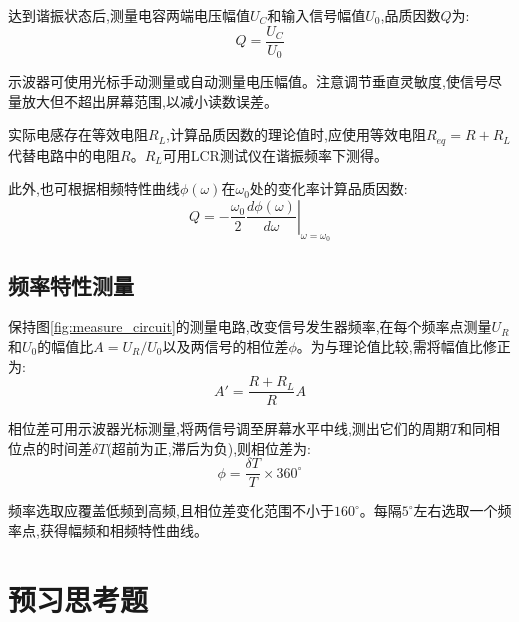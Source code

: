 \documentclass[UTF8]{ctexart}
\begin{document}
达到谐振状态后,测量电容两端电压幅值$U_C$和输入信号幅值$U_0$,品质因数$Q$为:
\begin{equation}
Q = \frac{U_C}{U_0}
\end{equation}

示波器可使用光标手动测量或自动测量电压幅值。注意调节垂直灵敏度,使信号尽量放大但不超出屏幕范围,以减小读数误差。

实际电感存在等效电阻$R_L$,计算品质因数的理论值时,应使用等效电阻$R_{eq}=R+R_L$代替电路中的电阻$R$。$R_L$可用LCR测试仪在谐振频率下测得。

此外,也可根据相频特性曲线$\phi(\omega)$在$\omega_0$处的变化率计算品质因数:
\begin{equation}
Q = -\frac{\omega_0}{2}\left.\frac{d\phi(\omega)}{d\omega}\right|_{\omega=\omega_0}
\end{equation}

\subsection{频率特性测量}

保持图\ref{fig:measure_circuit}的测量电路,改变信号发生器频率,在每个频率点测量$U_R$和$U_0$的幅值比$A=U_R/U_0$以及两信号的相位差$\phi$。为与理论值比较,需将幅值比修正为:
\begin{equation}
A' = \frac{R+R_L}{R}A
\end{equation}

相位差可用示波器光标测量,将两信号调至屏幕水平中线,测出它们的周期$T$和同相位点的时间差$\delta T$(超前为正,滞后为负),则相位差为:
\begin{equation}
\phi = \frac{\delta T}{T} \times 360^\circ
\end{equation}

频率选取应覆盖低频到高频,且相位差变化范围不小于$160^\circ$。每隔$5^\circ$左右选取一个频率点,获得幅频和相频特性曲线。

\section{预习思考题}
\end{document}
